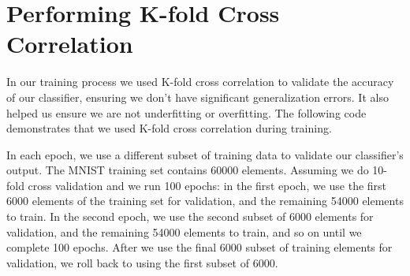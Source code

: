 \documentclass[11pt]{article}
\begin{document}
    \section{Performing K-fold Cross
Correlation}\label{performing-k-fold-cross-correlation}

In our training process we used K-fold cross correlation to validate
the accuracy of our classifier, ensuring we don't have significant
generalization errors. It also helped us ensure we are not underfitting
or overfitting. The following code demonstrates that we used K-fold
cross correlation during training.

In each epoch, we use a different subset of training data to validate
our classifier's output. The MNIST training set contains 60000 elements.
Assuming we do 10-fold cross validation and we run 100 epochs: in the
first epoch, we use the first 6000 elements of the training set for
validation, and the remaining 54000 elements to train. In the second
epoch, we use the second subset of 6000 elements for validation, and the
remaining 54000 elements to train, and so on until we complete 100 epochs.
After we use the final 6000 subset of training elements for validation,
we roll back to using the first subset of 6000.
\end{document}

